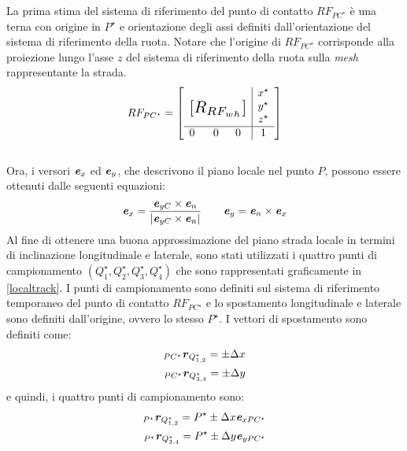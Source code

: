 %
\noindent
La prima stima del sistema di riferimento del punto di contatto $RF_{PC^\star}$ è una terna con origine in $P^\star$ e orientazione degli assi definiti dall'orientazione del sistema di riferimento della ruota. Notare che l'origine di $RF_{PC^\star}$ corrisponde alla proiezione lungo l'asse $z$ del sistema di riferimento della ruota sulla \textit{mesh} rappresentante la strada.
%
\begin{equation}
RF_{PC^\star} = \left[
\begin{array}{ccc|c}
& & & x^\star\\
\multicolumn{3}{c|}{\multirow{3}{*}{\raisebox{20mm}{\scalebox{1.5}{$[R_{RF_{wh}}]$}}}} & y^\star\\
& & & z^\star\\ \hline
0 & ~~0 & 0 & 1
\end{array}\right]
\end{equation}\\
%
Ora, i versori $\textbf{\textit{e}}_x$ ed $\textbf{\textit{e}}_y$, che descrivono il piano locale nel punto $P$, possono essere ottenuti dalle seguenti equazioni:
%
\begin{equation}
\textbf{\textit{e}}_x = \frac{\textbf{\textit{e}}_{yC}\times\textbf{\textit{e}}_{n}}{|\textbf{\textit{e}}_{yC}\times\textbf{\textit{e}}_{n}|}
\qquad
\textbf{\textit{e}}_{y} = \textbf{\textit{e}}_{n}\times\textbf{\textit{e}}_{x}
\label{terna}
\end{equation}
%
Al fine di ottenere una buona approssimazione del piano strada locale in termini di inclinazione longitudinale e laterale, sono stati utilizzati i quattro punti di campionamento $(Q^\star_1, Q^\star_2, Q^\star_3, Q^\star_4)$ che sono rappresentati graficamente in \figurename{ \ref{localtrack}}. I punti di campionamento sono definiti sul sistema di riferimento temporaneo del punto di contatto $RF_{PC^\star}$ e lo spostamento longitudinale e laterale sono definiti dall'origine, ovvero lo stesso $P^\star$. I vettori di spostamento sono definiti come:
%
\begin{equation}
\begin{split}
_{PC^\star}\textbf{\textit{r}}_{Q^\star_{1,2}} = \pm \Delta x \\
_{PC^\star}\textbf{\textit{r}}_{Q^\star_{3,4}} = \pm \Delta y
\end{split}
\end{equation}
%
e quindi, i quattro punti di campionamento sono:
%
\begin{equation}
\begin{split}
_{P^\star}\textbf{\textit{r}}_{Q^\star_{1,2}} = P^\star \pm \Delta x \textbf{\textit{e}}_{xPC^\star} \\
_{P^\star}\textbf{\textit{r}}_{Q^\star_{3,4}} = P^\star \pm \Delta y \textbf{\textit{e}}_{yPC^\star}
\end{split}
\end{equation}
